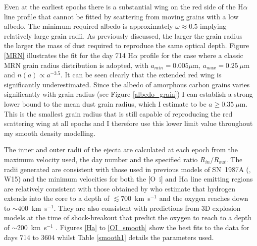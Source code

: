 Even at the earliest epochs there is a substantial wing on the red side of 
the H$\alpha$ line profile that cannot be fitted by scattering from moving 
grains with a low albedo.  The minimum required albedo is approximately 
$\omega \approx 0.5$ implying relatively large grain radii.  As previously 
discussed, the larger the grain radius the larger the mass of dust required 
to reproduce the same optical depth.  Figure \ref{MRN} illustrates the fit 
for the day 714 H$\alpha$ profile for the case where a classic MRN 
\citep{Mathis1977} grain radius distribution is adopted, with $a_{min}=0.005 
\mu$m, $a_{max}=0.25~\mu$m and $n(a) \propto a^{-3.5}$.  It can be seen 
clearly that the extended red wing is significantly underestimated.  
Since the albedo of amorphous carbon grains varies significantly with 
grain radius (see Figure \ref{albedo_grain}) I can establish a strong 
lower bound to the mean dust grain radius, which I estimate to be $a \ge 
0.35~\mu$m.  This is the smallest grain radius that is still capable of 
reproducing the red scattering wing at all epochs and I therefore use 
this lower limit value throughout my smooth density modelling.


The inner and outer radii of the ejecta are calculated at each epoch from 
the maximum velocity used, the day number and the specified ratio 
$R_{in}/R_{out}$.  The radii generated are consistent with those used in 
previous models of SN~1987A (\citealt{Ercolano2007}, W15) and the 
minimum velocities for both the [O~{\sc i}] and H$\alpha$ line emitting 
regions are relatively consistent with those obtained by \citet{Kozma1998b} 
who estimate that  hydrogen extends into the core to a depth of 
$\lesssim 700$~km~s$^{-1}$ and the oxygen reaches down to $\sim 
400$~km~s$^{-1}$.  They are also consistent with predictions from 3D 
explosion models at the time of shock-breakout that predict the oxygen to 
reach to a depth of $\sim 200$~km~s$^{-1}$ 
\citep{Hammer2010,Wongwathanarat2015}. Figures \ref{Ha} to 
\ref{OI_smooth} show the best fits to the data for days 714 to 3604 
whilst Table \ref{smooth1} details the parameters used.

